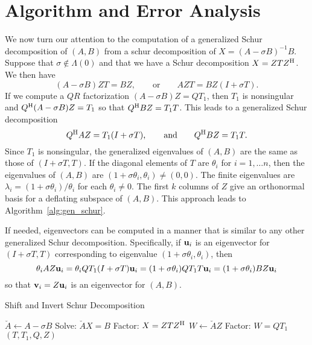 \documentclass[12pt]{article}
\def\eqand{\qquad\mbox{and}\qquad}
\def\vec#1{{\bf #1}}
\def\H{{\rm H}}
\begin{document}
\section{Algorithm and Error Analysis}
\label{sec:algor-error-analys}

We now turn our attention to the computation of a generalized Schur
decomposition of $(A,B)$ from a schur decomposition of
$X = (A-\sigma B)^{-1} B$.  Suppose that $\sigma \notin \Lambda(0)$
and that we have a Schur decomposition $X = ZTZ^\H$.  We then have
\begin{equation*}
  (A -\sigma B) Z T = B Z,\qquad\mbox{or}\qquad
  A Z T = B Z (I +\sigma T).
\end{equation*}
If we compute a $QR$ factorization $(A -\sigma B)Z = QT_1$, then $T_1$
is nonsingular and $Q^\H (A-\sigma B) Z = T_1$ so that
$Q^\H BZ = T_1 T$.  This leads to a generalized Schur decomposition
\begin{equation*}
  Q^\H A Z = T_1(I+\sigma T),\eqand Q^\H BZ = T_1 T.
\end{equation*}
Since $T_1$ is nonsingular, the generalized eigenvalues of $(A,B)$ are
the same as those of $(I+\sigma T, T)$.  If the diagonal elements of
$T$ are $\theta_i$ for $i=1,\ldots n$, then the eigenvalues of $(A,B)$
are $(1+\sigma\theta_i, \theta_i)\neq (0,0)$.  The finite eigenvalues
are $\lambda_i = (1+\sigma \theta_i)/\theta_i$ for each
$\theta_i\neq 0$.  The first $k$ columns of $Z$ give an orthonormal
basis for a deflating subspace of $(A,B)$.  This approach leads to
Algorithm~\ref{alg:gen_schur}.

If needed, eigenvectors can be computed in a manner that is similar to
any other generalized Schur decomposition.  Specifically, if
$\vec{u}_i$ is an eigenvector for $(I+\sigma T, T)$ corresponding to
eigenvalue $(1+\sigma\theta_i, \theta_i)$, then
\begin{equation*}
  \theta_i A Z \vec{u}_i 
  = \theta_i QT_1(I+\sigma T) \vec{u}_i
  = (1+\sigma \theta_i) Q T_1 T \vec{u}_i
  = (1+\sigma \theta_i) B Z \vec{u}_i
\end{equation*}
so that $\vec{v}_i = Z \vec{u}_i$ is an eigenvector for $(A,B)$.  

\begin{algorithm}
\caption{Shift and Invert Schur Decomposition}
\label{alg:gen_schur}
\begin{algorithmic}
\State $\breve{A} \gets A - \sigma B$
\State Solve: $\breve{A}X = B$
\State Factor: $X = Z T Z^{\H}$
\State $W \gets \breve{A}Z$
\State Factor: $W = Q T_1$
\State \Return $(T, T_1, Q, Z)$
\EndFunction
\end{algorithmic}
\end{algorithm}
\end{document}
